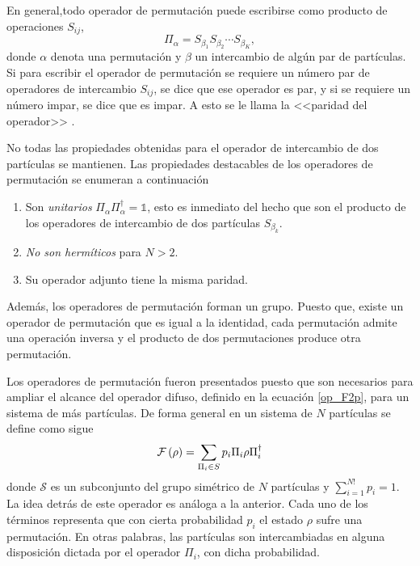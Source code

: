 En general,todo operador de permutación puede escribirse como producto de operaciones $S_{ij}$, \begin{equation}\label{eq:permutation_operator}\Pi_{\alpha}=S_{\beta_1}S_{\beta_2}\cdots S_{\beta_K}, \end{equation} donde $\alpha$ denota una permutación y $\beta$ un intercambio de algún par de partículas. Si para escribir el operador de permutación se requiere un número par de operadores de intercambio $S_{ij}$, se dice que ese operador es par, y si se requiere un número impar, se dice que es impar. A esto se le llama la <<paridad del operador>> {\cite{cohen1977quantum}}. 


No todas las propiedades obtenidas para el operador de intercambio de dos partículas se mantienen. Las propiedades destacables de los operadores de permutación se enumeran a continuación 
\begin{enumerate}
    \item Son \textit{unitarios} $\Pi_\alpha\Pi_\alpha^{\dagger}=\mathds{1}$, esto es inmediato del hecho que son el producto de los operadores de intercambio de dos partículas $S_{\beta_k}$.
    \item \textit{No son hermíticos} para $N>2$. 
    \item Su operador adjunto tiene la misma paridad.

\end{enumerate}

Además, los operadores de permutación forman un grupo. Puesto que, existe un operador de permutación que es igual a la identidad, cada permutación admite una operación inversa y el producto de dos permutaciones produce otra permutación.


Los operadores de permutación fueron presentados puesto que son necesarios para ampliar el alcance del operador difuso, definido en la ecuación {\eqref{op_F2p}}, para un sistema de más partículas. De forma general en un sistema de $N$ partículas se define como sigue\begin{equation}\label{eq:fuzzy-op-nparticles}
    \mathcal{F}\left(\rho\right)=\sum_{\Pi_i\in S}p_{i}\Pi_{i}\rho\Pi_{i}^{\dagger}
 \end{equation}donde $\mathcal{S}$ es un subconjunto del grupo simétrico de $N$ partículas y $\sum_{i=1}^{N!} p_i=1$.  La idea detrás de este operador es análoga a la anterior. Cada uno de los términos representa que con cierta probabilidad $p_i$ el estado $\rho$ sufre una permutación. En otras palabras, las partículas son intercambiadas en alguna disposición dictada por el operador $\Pi_{i}$, con dicha probabilidad.






